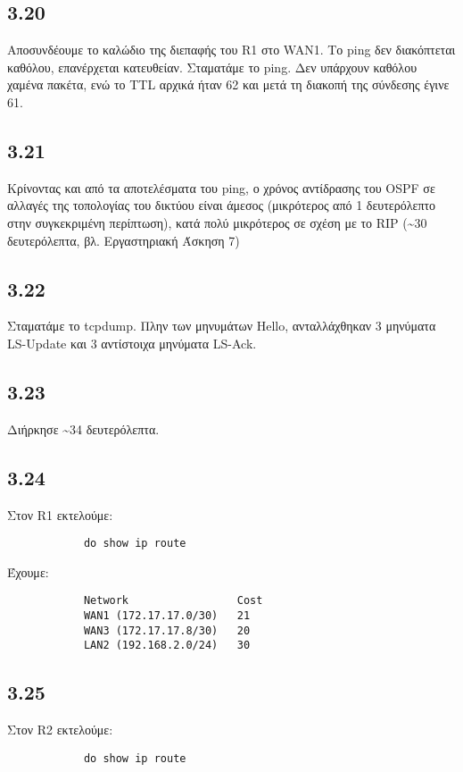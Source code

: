 \documentclass[a4paper, 12pt]{article}
\begin{document}
	\subsection*{3.20}
		Αποσυνδέουμε το καλώδιο της διεπαφής του R1 στο WAN1. Το ping δεν διακόπτεται καθόλου, επανέρχεται κατευθείαν. Σταματάμε το ping. Δεν υπάρχουν καθόλου χαμένα πακέτα, ενώ το TTL αρχικά ήταν 62 και μετά τη διακοπή της σύνδεσης έγινε 61.

	\subsection*{3.21}
		Κρίνοντας και από τα αποτελέσματα του ping, ο χρόνος αντίδρασης του OSPF σε αλλαγές της τοπολογίας του δικτύου είναι άμεσος (μικρότερος από 1 δευτερόλεπτο στην συγκεκριμένη περίπτωση), κατά πολύ μικρότερος σε σχέση με το RIP (\textasciitilde30 δευτερόλεπτα, βλ. Εργαστηριακή Άσκηση 7)

	\subsection*{3.22}
		Σταματάμε το tcpdump. Πλην των μηνυμάτων Hello, ανταλλάχθηκαν 3 μηνύματα LS-Update και 3 αντίστοιχα μηνύματα LS-Ack.

	\subsection*{3.23}
		Διήρκησε \textasciitilde34 δευτερόλεπτα.

	\subsection*{3.24}
		Στον R1 εκτελούμε:
		
		\begin{verbatim}
			do show ip route
		\end{verbatim}
		
		Έχουμε:
		
		\begin{verbatim}
			Network                 Cost
			WAN1 (172.17.17.0/30)   21
			WAN3 (172.17.17.8/30)   20
			LAN2 (192.168.2.0/24)   30
		\end{verbatim}

	\subsection*{3.25}
		Στον R2 εκτελούμε:
		
		\begin{verbatim}
			do show ip route
		\end{verbatim}
		
\end{document}
